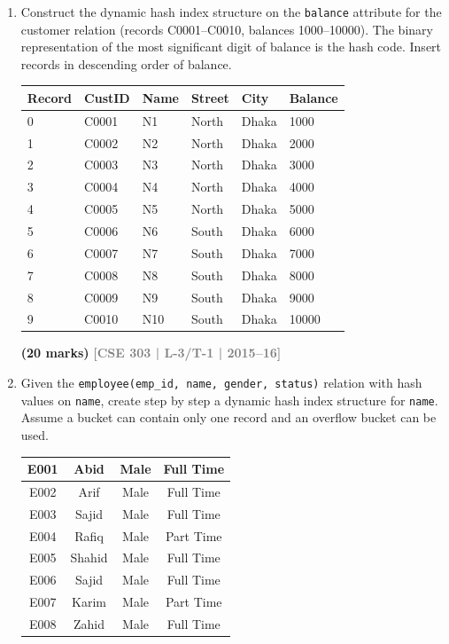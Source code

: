 \documentclass[12pt]{article}
\newcommand{\yr}[1]{\hfill\textcolor{gray}{\small\textbf{[#1]}}}
\newcommand{\mk}[1]{\textcolor{orange!70!black}{\small\textbf{(#1 marks)}}}
\begin{document}
\begin{enumerate}
\item Construct the dynamic hash index structure on the \texttt{balance} attribute for the customer relation (records C0001--C0010, balances 1000--10000). The binary representation of the most significant digit of balance is the hash code. Insert records in descending order of balance.
\medskip
\begin{center}
\small
\begin{tabular}{llllll}
\toprule
\textbf{Record} & \textbf{CustID} & \textbf{Name} & \textbf{Street} & \textbf{City} & \textbf{Balance}\\
\midrule
0 & C0001 & N1 & North & Dhaka & 1000\\
1 & C0002 & N2 & North & Dhaka & 2000\\
2 & C0003 & N3 & North & Dhaka & 3000\\
3 & C0004 & N4 & North & Dhaka & 4000\\
4 & C0005 & N5 & North & Dhaka & 5000\\
5 & C0006 & N6 & South & Dhaka & 6000\\
6 & C0007 & N7 & South & Dhaka & 7000\\
7 & C0008 & N8 & South & Dhaka & 8000\\
8 & C0009 & N9 & South & Dhaka & 9000\\
9 & C0010 & N10 & South & Dhaka & 10000\\
\bottomrule
\end{tabular}
\end{center}

\mk{20} \yr{CSE 303 | L-3/T-1 | 2015--16}


\item Given the \texttt{employee(emp\_id, name, gender, status)} relation with hash values on \texttt{name}, create step by step a dynamic hash index structure for \texttt{name}. Assume a bucket can contain only one record and an overflow bucket can be used.
\begin{center}
  \renewcommand{\arraystretch}{1.3} %
    \begin{tabular}{|c|c|c|c|}
        \hline
        E001 & Abid   & Male & Full Time \\ \hline
        E002 & Arif   & Male & Full Time \\ \hline
        E003 & Sajid  & Male & Full Time \\ \hline
        E004 & Rafiq  & Male & Part Time \\ \hline
        E005 & Shahid & Male & Full Time \\ \hline
        E006 & Sajid  & Male & Full Time \\ \hline
        E007 & Karim  & Male & Part Time \\ \hline
        E008 & Zahid  & Male & Full Time \\ \hline
    \end{tabular}
    

\end{center}
\end{enumerate}
\end{document}
